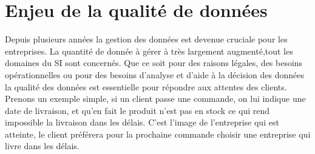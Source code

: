 \section {Enjeu de la qualité de données}
Depuis plusieurs années la gestion des données est devenue cruciale pour les entreprises. La quantité de donnée à gérer à très largement augmenté,tout les domaines du SI sont concernés. Que ce soit pour des raisons légales, des besoins opérationnelles ou pour des besoins d'analyse et d'aide à la décision des données la qualité des données est essentielle pour répondre aux attentes des clients. Prenons un exemple simple, si un client passe une commande, on lui indique une date de livraison, et qu'en fait le produit n'est pas en stock ce qui rend impossible la livraison dans les délais. C'est l'image de l'entreprise qui est atteinte, le client préférera pour la prochaine commande choisir une entreprise qui livre dans les délais. 
